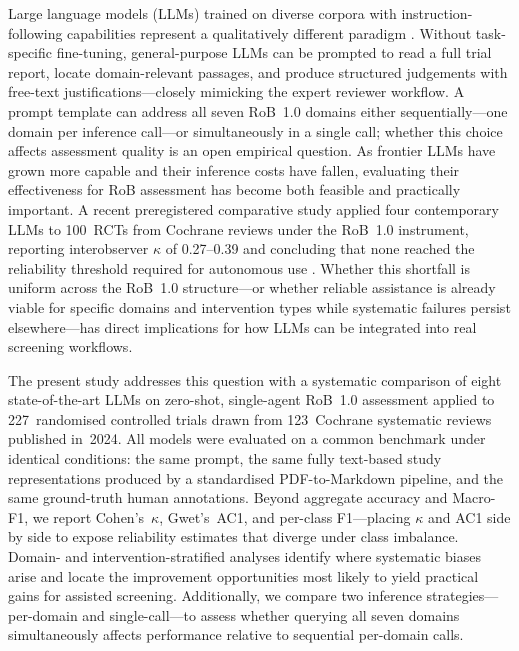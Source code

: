 \documentclass[../main.tex]{subfiles}
\begin{document}
Large language models (LLMs) trained on diverse corpora with instruction-following
capabilities represent a qualitatively different paradigm
\citep{Lieberum2025, Scherbakov2025}.
Without task-specific fine-tuning, general-purpose LLMs can be prompted to read a
full trial report, locate domain-relevant passages, and produce structured judgements
with free-text justifications---closely mimicking the expert reviewer workflow.
A prompt template can address all seven RoB~1.0 domains either sequentially---one
domain per inference call---or simultaneously in a single call; whether this
choice affects assessment quality is an open empirical question.
As frontier LLMs have grown more capable and their inference costs have fallen,
evaluating their effectiveness for RoB assessment has become both feasible and
practically important.
A recent preregistered comparative study applied four contemporary LLMs to
100~RCTs from Cochrane reviews under the RoB~1.0 instrument, reporting
interobserver $\kappa$ of 0.27--0.39 and concluding that none reached the
reliability threshold required for autonomous use \citep{Nyrhi2026}.
Whether this shortfall is uniform across the RoB~1.0 structure---or whether
reliable assistance is already viable for specific domains and intervention types
while systematic failures persist elsewhere---has direct implications for how
LLMs can be integrated into real screening workflows.

The present study addresses this question with a systematic comparison of eight
state-of-the-art LLMs on zero-shot, single-agent RoB~1.0 assessment applied to
227~randomised controlled trials drawn from 123~Cochrane systematic reviews
published in~2024.
All models were evaluated on a common benchmark under identical conditions: the same
prompt, the same fully text-based study representations produced by a standardised
PDF-to-Markdown pipeline, and the same ground-truth human annotations.
Beyond aggregate accuracy and Macro-F1, we report Cohen's~$\kappa$, Gwet's~AC1,
and per-class F1---placing $\kappa$ and AC1 side by side to expose reliability
estimates that diverge under class imbalance.
Domain- and intervention-stratified analyses identify where systematic biases arise
and locate the improvement opportunities most likely to yield practical gains for
assisted screening.
Additionally, we compare two inference strategies---per-domain and
single-call---to assess whether querying all seven domains simultaneously
affects performance relative to sequential per-domain calls.
\end{document}

